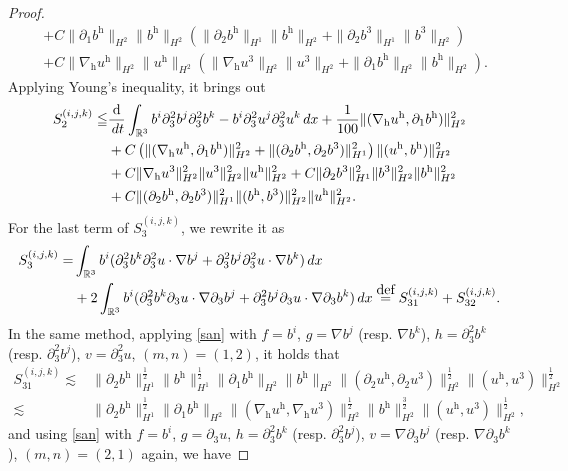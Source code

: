 \documentclass[10pt,a4paper]{amsart}
\newcommand{\R}{\mathbb{R}}
\newcommand{\dt}{\,{\rm d}t}
\newcommand{\dx}{\,{\rm d}x}
\def\eqdefa{\buildrel\hbox{\footnotesize def}\over =}
\newcommand{\h}{\mathrm{h}}
\newcommand{\nablah}{\nabla_{\mathrm{h}}}
\begin{document}
\begin{proof}
\begin{align*}
		&+C\|\partial_1b^\h\|_{H^2}\|b^\h\|_{H^2}\left(\|\partial_2b^\h\|_{H^1}\|b^\h\|_{H^2}+\|\partial_2b^3\|_{H^1}\|b^3\|_{H^2}\right)\nonumber\\
		&+ C\|\nablah u^\h\|_{H^2}\|u^\h\|_{H^2}\left(\|\nablah u^3\|_{H^2}\|u^3\|_{H^2}+\|\partial_1b^\h\|_{H^2}\| b^\h\|_{H^2}\right).
	\end{align*}
	Applying Young's inequality, it brings out
	\begin{align}\label{S2}
		S^{(i,j,k)}_{2}\leqq &\frac{\mathrm{d}}{\dt}\int_{\R^3} b^i\partial_3^2b^j\partial_3^2b^k-b^i\partial_3^2u^j\partial_3^2u^k\dx+\frac{1}{100}\|(\nablah u^\h,\partial_1b^\h)\|_{H^2}^2\nonumber\\
		&+C\left(\|(\nablah u^\h,\partial_1b^\h)\|_{H^2}^2+\|(\partial_2b^\h,\partial_2b^3)\|_{H^1}^2\right)\|(u^\h,b^\h)\|_{H^2}^2\nonumber\\
		&+C\|\nablah u^3\|_{H^2}^2\|u^3\|_{H^2}^2 \|u^\h\|_{H^2}^2+C\|\partial_2b^3\|_{H^1}^2\|b^3\|_{H^2}^2\|b^\h\|_{H^2}^2\nonumber\\
		&+C\|(\partial_2b^\h,\partial_2b^3)\|_{H^1}^2\|(b^\h,b^3)\|_{H^2}^2\|u^\h\|_{H^2}^2.
	\end{align}
	For the last term of $S^{(i,j,k)}_{3}$, we rewrite it as
	\begin{align*}
		S^{(i,j,k)}_{3}=&\int_{\R^3} b^i (\partial_3^2b^k\partial_3^2u\cdot\nabla{b}^j+\partial_3^2b^j\partial_3^2u\cdot\nabla{b}^k)\dx\\
		&+2\int_{\R^3}b^i(\partial_3^2b^k\partial_3u\cdot\nabla\partial_3{b}^j+\partial_3^2b^j\partial_3u\cdot\nabla\partial_3{b}^k)\dx
		\eqdefa S^{(i,j,k)}_{31}+S^{(i,j,k)}_{32}.
	\end{align*}
	In the same method, applying \eqref{san} with $f=b^i$, $g=\nabla b^j$ (resp. $\nabla b^k$), $h=\partial_3^2b^k$ (resp. $\partial_3^2b^j$), $v=\partial_3^2u$, $(m,n)=(1,2)$, it holds that
	\begin{align*}
		S^{(i,j,k)}_{31}\lesssim&\|\partial_2b^\h\|_{H^1}^\frac12\|b^\h\|_{H^1}^\frac12\|\partial_1b^\h\|_{H^2}\|b^\h\|_{H^2}\|(\partial_2u^\h,\partial_2u^3)\|_{H^2}^\frac12\|(u^\h,u^3)\|_{H^2}^\frac12\\
		\lesssim&\|\partial_2b^\h\|_{H^1}^\frac12\|\partial_1b^\h\|_{H^2}\|(\nablah u^\h,\nablah u^3)\|_{H^2}^\frac12\|b^\h\|_{H^2}^\frac32\|(u^\h,u^3)\|_{H^2}^\frac12,
	\end{align*}
	and using \eqref{san} with $f=b^i$, $g=\partial_3u$, $h=\partial_3^2b^k$ (resp. $\partial_3^2b^j$), $v=\nabla\partial_3{b}^j$ (resp. $\nabla\partial_3{b}^k$), $(m,n)=(2,1)$ again, we have

\end{proof}
\end{document}
